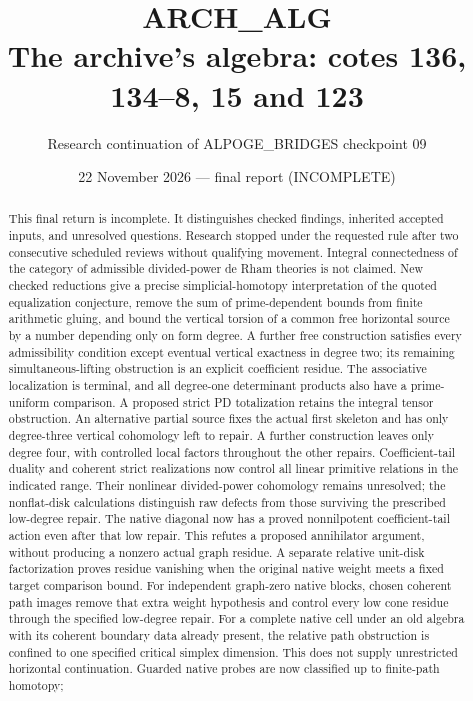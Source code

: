 \documentclass[11pt,a4paper]{article}
\title{ARCH\_ALG\\The archive's algebra: cotes 136, 134--8, 15 and 123}
\author{Research continuation of ALPOGE\_BRIDGES checkpoint 09}
\date{22 November 2026 --- final report (INCOMPLETE)}
\begin{document}
\maketitle
\begin{abstract}
This final return is incomplete. It distinguishes checked findings,
inherited accepted inputs, and unresolved questions. Research stopped
under the requested rule after two consecutive scheduled reviews
without qualifying movement. Integral
connectedness of the category of admissible divided-power de Rham theories
is not claimed. New checked reductions give a precise simplicial-homotopy
interpretation of the quoted equalization conjecture, remove the sum of
prime-dependent bounds from finite arithmetic gluing, and bound the
vertical torsion of a common free horizontal source by a number depending
only on form degree. A further free construction satisfies every
admissibility condition except eventual vertical exactness in degree two;
its remaining simultaneous-lifting obstruction is an explicit coefficient
residue. The associative localization is terminal, and all degree-one
determinant products also have a prime-uniform comparison. A proposed
strict PD totalization retains the integral tensor obstruction.
An alternative partial source fixes the actual first skeleton and has
only degree-three vertical cohomology left to repair. A further construction
leaves only degree four, with controlled local factors throughout the
other repairs. Coefficient-tail
duality and coherent strict realizations now control all linear
primitive relations in the indicated range. Their nonlinear divided-power
cohomology remains unresolved; the nonflat-disk calculations distinguish
raw defects from those surviving the prescribed low-degree repair.
The native diagonal now has a proved nonnilpotent coefficient-tail
action even after that low repair. This refutes a proposed annihilator
argument, without producing a nonzero actual graph residue.
A separate relative unit-disk factorization proves residue vanishing
when the original native weight meets a fixed target comparison bound.
For independent graph-zero native blocks, chosen coherent path images
remove that extra weight hypothesis and control every low cone residue
through the specified low-degree repair. For a complete native cell under
an old algebra with its coherent boundary data already present, the
relative path obstruction is confined to one specified critical simplex
dimension. This does not supply unrestricted horizontal continuation.
Guarded native probes are now classified up to finite-path homotopy;

\end{abstract}
\end{document}
